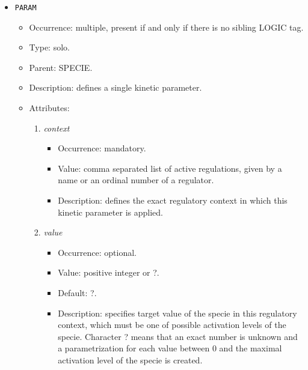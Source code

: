 \documentclass[12pt]{article}
\newenvironment{menum}{
\begin{enumerate}
  \setlength{\itemsep}{0pt}
  \setlength{\parskip}{0pt}
  \setlength{\parsep}{0pt}
}{\end{enumerate}}
\newenvironment{mitem}{
\begin{itemize}
  \setlength{\itemsep}{0pt}
  \setlength{\parskip}{0pt}
  \setlength{\parsep}{0pt}
}{\end{itemize}}
\begin{document}
\begin{mitem}
	\item \texttt{PARAM}
	\begin{mitem}
		\item Occurrence: multiple, present if and only if there is no sibling LOGIC tag.
		\item Type: solo.
		\item Parent: SPECIE.
		\item Description: defines a single kinetic parameter.
		\item Attributes:	
		\begin{menum}
			\item \textit{context} 
			\begin{mitem}
				\item Occurrence: mandatory.
				\item Value: comma separated list of active regulations, given by a name or an ordinal number of a regulator.
				\item Description: defines the exact regulatory context in which this kinetic parameter is applied.
			\end{mitem}
			\item \textit{value} 
			\begin{mitem}
				\item Occurrence: optional.
				\item Value: positive integer or ?.
				\item Default: ?.
				\item Description: specifies target value of the specie in this regulatory context, which must be one of possible activation levels of the specie. Character ? means that an exact number is unknown and a parametrization for each value between 0 and the maximal activation level of the specie is created.
			\end{mitem}
		\end{menum}
	\end{mitem}
\end{mitem}
	
\end{document}
